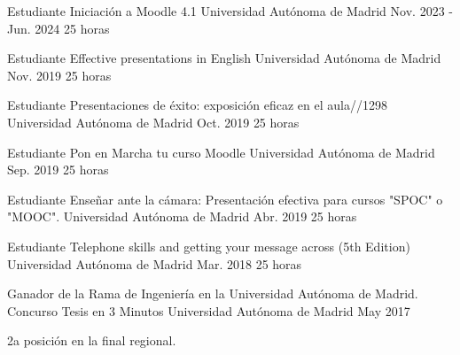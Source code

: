 \begin{cventries}
  \cventry
    {Estudiante} %
    {Iniciación a Moodle 4.1} %
    {Universidad Autónoma de Madrid} %
    {Nov. 2023 - Jun. 2024} %
    {25 horas}

  \cventry
    {Estudiante} %
    {Effective presentations in English} %
    {Universidad Autónoma de Madrid} %
    {Nov. 2019} %
    {25 horas}

  \cventry
    {Estudiante} %
    {Presentaciones de éxito: exposición eficaz en el aula//1298} %
    {Universidad Autónoma de Madrid} %
    {Oct. 2019} %
    {25 horas
    }

  \cventry
    {Estudiante} %
    {Pon en Marcha tu curso Moodle} %
    {Universidad Autónoma de Madrid} %
    {Sep. 2019} %
    {25 horas
    }

  \cventry
    {Estudiante} %
    {Enseñar ante la cámara: Presentación efectiva para cursos "SPOC" o
"MOOC".} %
    {Universidad Autónoma de Madrid} %
    {Abr. 2019} %
    {25 horas
    }
    
  \cventry
    {Estudiante} %
    {Telephone skills and getting your message across (5th Edition)} %
    {Universidad Autónoma de Madrid} %
    {Mar. 2018} %
    {25 horas
    }

\end{cventries}

\begin{cventries}
  \cventry
    {Ganador de la Rama de Ingeniería en la Universidad Autónoma de Madrid.} %
    {Concurso Tesis en 3 Minutos} %
    {Universidad Autónoma de Madrid} %
    {May 2017} %
    {
      \begin{cvitems} %
        \item {2a posición en la final regional.}
      \end{cvitems}
    }
\end{cventries}